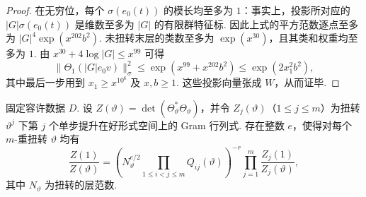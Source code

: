 \begin{proof}
在无穷位，每个 $\sigma(e_0(t))$ 的模长均至多为 $1$：事实上，投影所对应的 $|G|\sigma(e_0(t))$ 是维数至多为 $|G|$ 的有限群特征标. 因此上式的平方范数逐点至多为 $|G|^4\exp(x^{202}b^2)$. 未扭转末层的类数至多为 $\exp(x^{30})$，且其类和权重均至多为 $1$. 由 $x^{30}+4\log |G|\le x^{99}$ 可得
\[
 \|\Theta_1(|G|e_0 v)\|_\sigma^2
 \le \exp(x^{99}+x^{202}b^2)
 \le \exp(2x_1^2b^2),
\]
其中最后一步用到 $x_1\ge x^{10^6}$ 及 $x,b\ge1$. 这些投影向量张成 $W$，从而证毕.
\end{proof}

\begin{lemma}
\label{lem:c-chain-factorization}
\emitthmsource
固定容许数据 $D$. 设 $Z(\vartheta)=\det(\Theta_\vartheta^*\Theta_\vartheta)$，并令 $Z_j(\vartheta)$（$1\le j\le m$）为扭转 $\vartheta^j$ 下第 $j$ 个单步提升在好形式空间上的 Gram 行列式. 存在整数 $e$，使得对每个 $m$-重扭转 $\vartheta$ 均有
\begin{equation}
 \frac{Z(1)}{Z(\vartheta)}
 =\left(N_\vartheta^{e/2}
          \prod_{1\le i<j\le m}Q_{ij}(\vartheta)\right)^{-r}
       \prod_{j=1}^m \frac{Z_j(1)}{Z_j(\vartheta)},
\label{eq:c-chain-ratio}
\end{equation}
其中 $N_\vartheta$ 为扭转的层范数.
\end{lemma}
